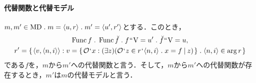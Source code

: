 \paragraph*{代替関数と代替モデル}$ m,m'\in\mathrm{MD}\con{1}m = \orp{u,r}\con{1}m'=\orp{u',r'} $とする．このとき，
\begin{gather*}
    \func f\con{1}\func\breve{f}\con{1}f\img\univ = u'\con{1}\breve{f}\img\univ = u,\\
    r' = \classab{\orp{v,\orp{n,i}}:
    v = \classab{\mathcal{O}\fap x:
        (\exists z)(
            \mathcal{O}\fap z\in r\fap \orp{n,i}\con{1}x = f\resl z
        )
    }\con{1}\orp{n,i}\in\arg r
    }
\end{gather*}
である$f$を，$ m $から$ m' $への代替関数と言う．そして，$ m $から$ m' $への代替関数が存在するとき，$m'$は$m$の代替モデルと言う．

